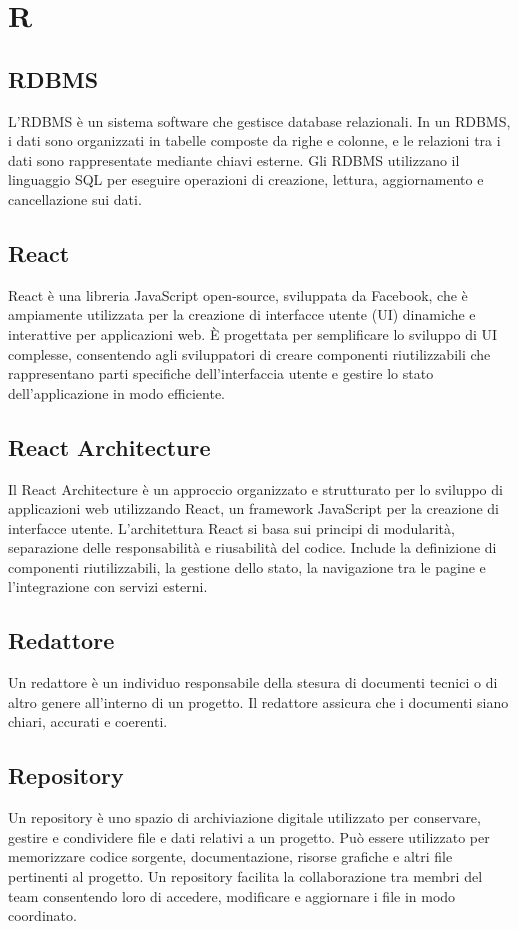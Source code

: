 \section*{R} 
\subsection*{RDBMS} 
L'RDBMS è un sistema software che gestisce database relazionali. In un RDBMS, i dati sono organizzati in tabelle composte da righe e colonne, e le relazioni tra i dati sono rappresentate mediante chiavi esterne. Gli RDBMS utilizzano il linguaggio SQL per eseguire operazioni di creazione, lettura, aggiornamento e cancellazione sui dati. 
\subsection*{React} 
React è una libreria JavaScript open-source, sviluppata da Facebook, che è ampiamente utilizzata per la creazione di interfacce utente (UI) dinamiche e interattive per applicazioni web. È progettata per semplificare lo sviluppo di UI complesse, consentendo agli sviluppatori di creare componenti riutilizzabili che rappresentano parti specifiche dell'interfaccia utente e gestire lo stato dell'applicazione in modo efficiente.
\subsection*{React Architecture} 
Il React Architecture è un approccio organizzato e strutturato per lo sviluppo di applicazioni web utilizzando React, un framework JavaScript per la creazione di interfacce utente. L'architettura React si basa sui principi di modularità, separazione delle responsabilità e riusabilità del codice. Include la definizione di componenti riutilizzabili, la gestione dello stato, la navigazione tra le pagine e l'integrazione con servizi esterni.
\subsection*{Redattore} 
Un redattore è un individuo responsabile della stesura di documenti tecnici o di altro genere all'interno di un progetto. Il redattore assicura che i documenti siano chiari, accurati e coerenti. 
\subsection*{Repository} 
Un repository è uno spazio di archiviazione digitale utilizzato per conservare, gestire e condividere file e dati relativi a un progetto. Può essere utilizzato per memorizzare codice sorgente, documentazione, risorse grafiche e altri file pertinenti al progetto. Un repository facilita la collaborazione tra membri del team consentendo loro di accedere, modificare e aggiornare i file in modo coordinato. 
